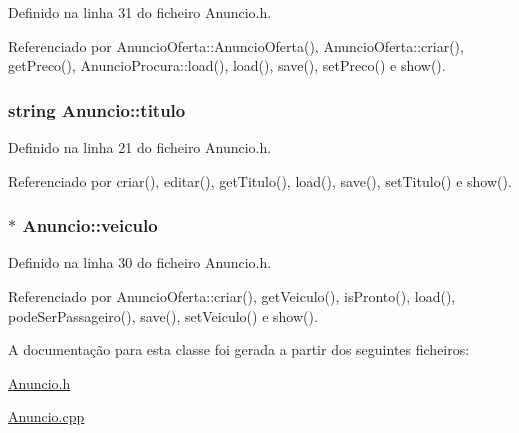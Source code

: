 Definido na linha 31 do ficheiro Anuncio.\+h.



Referenciado por Anuncio\+Oferta\+::\+Anuncio\+Oferta(), Anuncio\+Oferta\+::criar(), get\+Preco(), Anuncio\+Procura\+::load(), load(), save(), set\+Preco() e show().

\hypertarget{class_anuncio_adb34bedd8220f42b9ee37662c21313e6}{
\subsubsection[{titulo}]{\setlength{\rightskip}{0pt plus 5cm}string Anuncio\+::titulo\hspace{0.3cm}{\ttfamily [protected]}}}\label{class_anuncio_adb34bedd8220f42b9ee37662c21313e6}


Definido na linha 21 do ficheiro Anuncio.\+h.



Referenciado por criar(), editar(), get\+Titulo(), load(), save(), set\+Titulo() e show().

\hypertarget{class_anuncio_a3cffe1ce2024500bddaf07bd0f7ecc81}{
\subsubsection[{veiculo}]{$\ast$ Anuncio\+::veiculo\hspace{0.3cm}{\ttfamily [protected]}}}\label{class_anuncio_a3cffe1ce2024500bddaf07bd0f7ecc81}


Definido na linha 30 do ficheiro Anuncio.\+h.



Referenciado por Anuncio\+Oferta\+::criar(), get\+Veiculo(), is\+Pronto(), load(), pode\+Ser\+Passageiro(), save(), set\+Veiculo() e show().



A documentação para esta classe foi gerada a partir dos seguintes ficheiros\+:\begin{DoxyCompactItemize}
\item 
\hyperlink{_anuncio_8h}{Anuncio.\+h}\item 
\hyperlink{_anuncio_8cpp}{Anuncio.\+cpp}\end{DoxyCompactItemize}
